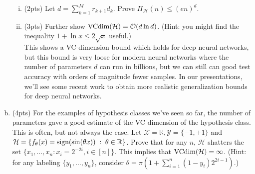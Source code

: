 \documentclass[11pt]{article}
\newcommand{\calX}{{\mathcal{X}}}
\newcommand{\calY}{{\mathcal{Y}}}
\newcommand{\calH}{{\mathcal{H}}}
\newcommand{\VC}{{\text{\rm VCdim}}}
\newcommand{\blue}[1]{{\color{blue}#1}}
\newcommand{\R}{\mathbb{R}}
\newcommand{\cbr}[1]{\left\{#1\right\}}
\newcommand{\order}{\ensuremath{\mathcal{O}}}
\newcommand{\sign}{{\text{\rm sign}}}
\begin{document}
\begin{enumerate}[(a)]
\begin{enumerate}[(i)]
\item (\blue{2pts}) 
Let $d = \sum_{k=1}^M r_{k+1} d_k$. Prove $\Pi_\calH(n) \leq (en)^d$. \\

\item (\blue{3pts}) 
Further show $\VC(\calH) = \order(d\ln d)$.
(Hint: you might find the inequality $1+\ln x \leq 2\sqrt{x}$ useful.)\\

This shows a VC-dimension bound which holds for deep neural networks, but this bound is very loose for modern neural networks where the number of parameters $d$ can run in billions, but we can still can good test accuracy with orders of magnitude fewer samples. In our presentations, we'll see some recent work to obtain more realistic generalization bounds for deep neural networks.

\end{enumerate}

\vspace{5pt}
\item (\blue{4pts}) 
For the examples of hypothesis classes we've seen so far, the number of parameters gave a good estimate of the VC dimension of the hypothesis class. This is often, but not always the case. Let $\calX = \R, \calY = \{-1,+1\}$ and $\calH = \cbr{f_\theta(x) = \sign(\sin(\theta x)) \;:\; \theta \in \R}$.
Prove that for any $n$, $\calH$ shatters the set $\{x_1,\dots,x_n: x_i = 2^{-2i}, i \in [n]\}$. This implies that $\VC(\calH) = \infty$.
(Hint: for any labeling $\{y_1,\dots, y_n\}$, consider $\theta = \pi(1+ \sum_{i=1}^n (1-y_i)2^{2i-1})$.)  \\

\end{enumerate}




\end{document}
